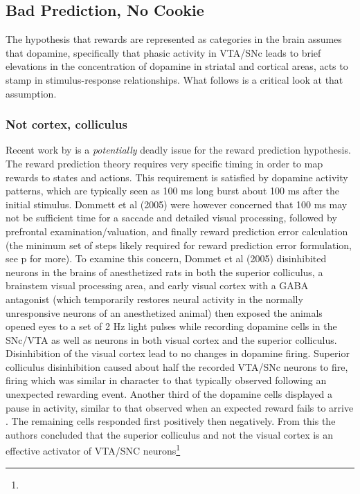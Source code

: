 \subsection{Bad Prediction, No Cookie}
\label{sub:bad}
The hypothesis that rewards are represented as categories in the brain assumes that dopamine, specifically that phasic activity in VTA/SNc leads to brief elevations in the concentration of dopamine in striatal and cortical areas, acts to stamp in stimulus-response relationships.  What follows is a critical look at that assumption.

\subsubsection{Not cortex, colliculus}
\label{subsub:colliculus}
Recent work by  is a \emph{potentially} deadly issue for the reward prediction hypothesis.  The reward prediction theory requires very specific timing in order to map rewards to states and actions.  This requirement is satisfied by dopamine activity patterns, which are typically seen as 100 ms long burst about 100 ms after the initial stimulus.  Dommett et al (2005) were however concerned that 100 ms may not be sufficient time for a saccade and detailed visual processing, followed by prefrontal examination/valuation, and finally reward prediction error calculation (the minimum set of steps likely required for reward prediction error formulation, see p\pageref{subsub:fclt} for more).  To examine this concern, Dommet et al (2005) disinhibited neurons in the brains of anesthetized rats in both the superior colliculus, a brainstem visual processing area, and early visual cortex with a GABA antagonist (which temporarily restores neural activity in the normally unresponsive neurons of an anesthetized animal) then exposed the animals opened eyes to a set of 2 Hz light pulses while recording dopamine cells in the SNc/VTA as well as neurons in both visual cortex and the superior colliculus.  Disinhibition of the visual cortex lead to no changes in dopamine firing.  Superior colliculus disinhibition caused about half the recorded  VTA/SNc neurons to fire, firing which was similar in character to that typically observed following an unexpected rewarding event.  Another third of the dopamine cells displayed a pause in activity, similar to that observed when an expected reward fails to arrive \cite{Mirenowicz:1994p7185}.  The remaining cells responded first positively then negatively.  From this the authors concluded that the superior colliculus and not the visual cortex is an effective activator of VTA/SNC neurons\footnote{
}
